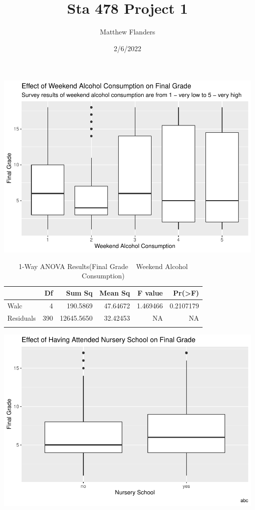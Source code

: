 \documentclass[
]{article}
\title{Sta 478 Project 1}
\author{Matthew Flanders}
\date{2/6/2022}
\begin{document}
\maketitle

\includegraphics{proj.-1write-up_files/figure-latex/math-Walc-1.pdf}

\begin{table}

\caption{\label{tab:math-Walc}1-Way ANOVA Results(Final Grade ~ Weekend Alcohol Consumption)}
\centering
\begin{tabular}[t]{l|r|r|r|r|r}
\hline
  & Df & Sum Sq & Mean Sq & F value & Pr(>F)\\
\hline
Walc & 4 & 190.5869 & 47.64672 & 1.469466 & 0.2107179\\
\hline
Residuals & 390 & 12645.5650 & 32.42453 & NA & NA\\
\hline
\multicolumn{6}{l}{\rule{0pt}{1em}}\\
\end{tabular}
\end{table}
\newpage

\includegraphics{proj.-1write-up_files/figure-latex/math-nursery-1.pdf}
\end{document}
